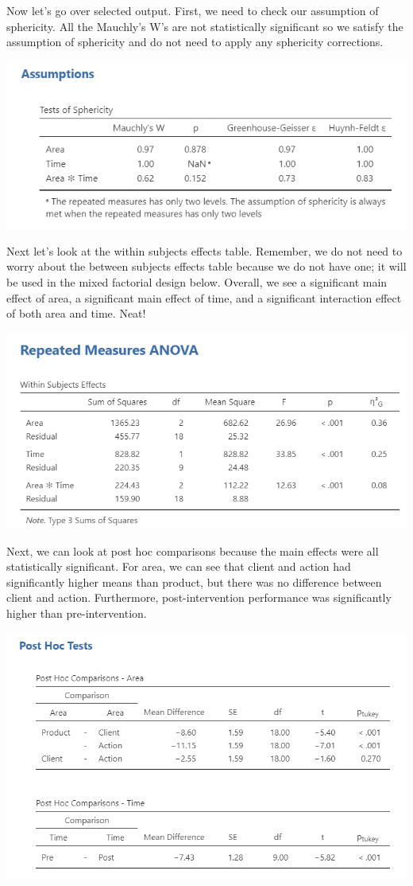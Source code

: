 \documentclass[
]{book}
\begin{document}
Now let's go over selected output. First, we need to check our assumption of sphericity. All the Mauchly's W's are not statistically significant so we satisfy the assumption of sphericity and do not need to apply any sphericity corrections.

\includegraphics{images/06-factorial-anova/rm-factorial_assumption.png}

Next let's look at the within subjects effects table. Remember, we do not need to worry about the between subjects effects table because we do not have one; it will be used in the mixed factorial design below. Overall, we see a significant main effect of area, a significant main effect of time, and a significant interaction effect of both area and time. Neat!

\includegraphics{images/06-factorial-anova/rm-factorial_results.png}

Next, we can look at post hoc comparisons because the main effects were all statistically significant. For area, we can see that client and action had significantly higher means than product, but there was no difference between client and action. Furthermore, post-intervention performance was significantly higher than pre-intervention.

\includegraphics{images/06-factorial-anova/rm-factorial_tukey.png}
\end{document}
